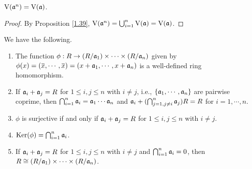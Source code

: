 \begin{fact}\label{1.45}
    $\operatorname{V}(\mathfrak{a}^n) = \operatorname{V}(\mathfrak{a})$.
\end{fact}

\begin{proof}
    By Proposition \ref{1.39}, $\operatorname{V}(\mathfrak{a}^n) = \bigcup_{i=1}^n \operatorname{V}(\mathfrak{a}) = \operatorname{V}(\mathfrak{a})$.
\end{proof}

\begin{proposition}\label{1.46}
    We have the following.
    \begin{enumerate}
        \item\label{1.46a} The function $\phi: R \to (R/\mathfrak{a}_1) \times \cdots \times (R/\mathfrak{a}_n)$ given by $\phi(x) = (\overbar x, \cdots, \overbar x) = (x+\ffa_1,\cdots,x+\ffa_n)$ is a well-defined ring homomorphism.
        \item\label{1.46b} If $\mathfrak{a}_i + \mathfrak{a}_j = R$ for $1 \leq i,j \leq n$ with $i \neq j$, i.e., $\{\mathfrak{a}_1,\cdots,\mathfrak{a}_n\}$ are pairwise coprime, then $\bigcap_{i=1}^n \mathfrak{a}_i = \mathfrak{a}_1 \cdots \mathfrak{a}_n$ and $\mathfrak{a}_i + (\bigcap_{j=1,j \neq i}^{n} \mathfrak{a}_j)R = R$ for $i = 1,\cdots,n$.
        \item\label{1.46c} $\phi$ is surjective if and only if $\mathfrak{a}_i + \mathfrak{a}_j = R$ for $1 \leq i,j \leq n$ with $i \neq j$.
        \item\label{1.46d} $\operatorname{Ker}(\phi) = \bigcap_{i=1}^{n} \mathfrak{a}_i$.
        \item\label{1.46e} If $\mathfrak{a}_i + \mathfrak{a}_j = R$ for $1 \leq i,j \leq n$ with $i \neq j$ and $\bigcap_{i=1}^n \mathfrak{a}_i = 0$, then $R \cong (R/\mathfrak{a}_1) \times \cdots \times(R/\mathfrak{a}_n)$.
    \end{enumerate}
\end{proposition}

